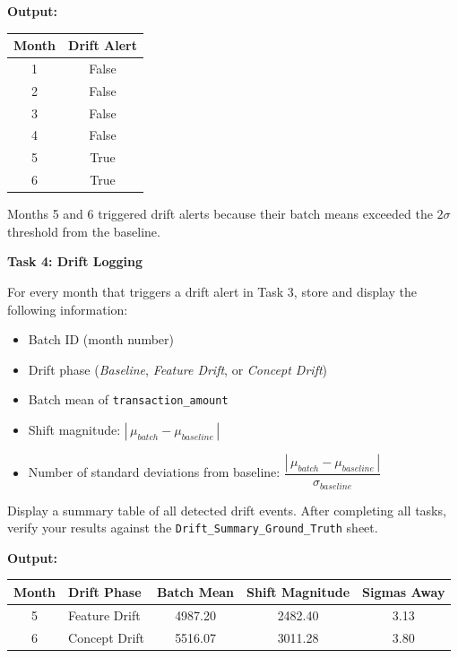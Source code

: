 \documentclass[12pt,a4paper]{article}
\begin{document}
\vspace{6pt}

\textbf{Output:}

\begin{center}
\renewcommand{\arraystretch}{1.4}
\begin{tabular}{cc}
\toprule
\textbf{Month} & \textbf{Drift Alert} \\
\midrule
1 & False \\
2 & False \\
3 & False \\
4 & False \\
5 & True \\
6 & True \\
\bottomrule
\end{tabular}
\renewcommand{\arraystretch}{1.0}
\end{center}

\vspace{4pt}
Months 5 and 6 triggered drift alerts because their batch means exceeded the $2\sigma$ threshold from the baseline.

\vspace{24pt}

\begin{tcolorbox}
\textbf{Task 4: Drift Logging}

For every month that triggers a drift alert in Task 3, store and display the following information:
\begin{itemize}
\item Batch ID (month number)
\item Drift phase (\textit{Baseline}, \textit{Feature Drift}, or \textit{Concept Drift})
\item Batch mean of \texttt{transaction\_amount}
\item Shift magnitude: $|\,\mu_{batch} - \mu_{baseline}\,|$
\item Number of standard deviations from baseline: $\dfrac{|\,\mu_{batch} - \mu_{baseline}\,|}{\sigma_{baseline}}$
\end{itemize}

Display a summary table of all detected drift events. After completing all tasks, verify your results against the \texttt{Drift\_Summary\_Ground\_Truth} sheet.
\end{tcolorbox}

\vspace{6pt}

\textbf{Output:}

\begin{center}
\renewcommand{\arraystretch}{1.4}
\begin{tabular}{clccc}
\toprule
\textbf{Month} & \textbf{Drift Phase} & \textbf{Batch Mean} & \textbf{Shift Magnitude} & \textbf{Sigmas Away} \\
\midrule
5 & Feature Drift & 4987.20 & 2482.40 & 3.13 \\
6 & Concept Drift & 5516.07 & 3011.28 & 3.80 \\
\bottomrule
\end{tabular}
\renewcommand{\arraystretch}{1.0}
\end{center}
\end{document}

